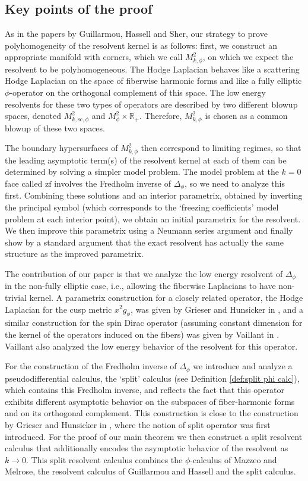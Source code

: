 \documentclass[11pt]{article}
\newcommand{\ie}{i.e.,\xspace}
\numberwithin{equation}{section}
\theoremstyle{plain}
\theoremstyle{definition}
\newcommand{\R}{{\mathbb{R}}}
\newcommand{\ssc}{{\mathrm{sc}}}
\newcommand{\zf}{{\mathrm{zf}}}
\begin{document}
\subsection{Key points of the proof}
As in the papers by Guillarmou, Hassell and Sher, our strategy to prove polyhomogeneity of the resolvent kernel is as follows: first, we construct an appropriate manifold with corners, which we call $M^2_{k,\phi}$, on which we expect the resolvent to be polyhomogeneous. The Hodge Laplacian behaves like a scattering Hodge Laplacian on the space of fiberwise harmonic forms and like a fully elliptic $\phi$-operator on the orthogonal complement of this space. The low energy resolvents for these two types of operators are described by two different blowup spaces, denoted $M^2_{k,\ssc,\phi}$ and $M^2_\phi\times\R_+$. Therefore, $M^2_{k,\phi}$ is chosen as a common blowup of these two spaces.

The boundary hypersurfaces of $M^2_{k,\phi}$ then correspond to limiting regimes, so that the leading asymptotic term(s) of the resolvent kernel at each of them can be determined by solving a simpler model problem. The model problem at the $k=0$ face called $\zf$ involves the Fredholm inverse of $\Delta_\phi$, so we need to analyze this first.
Combining these solutions and an interior parametrix, obtained by inverting the principal symbol (which corresponds to the `freezing coefficients' model problem at each interior point), we obtain an initial parametrix for the resolvent. We then improve this parametrix using a Neumann series argument and finally show by a standard argument that the exact resolvent has actually the same structure as the improved parametrix.

The contribution of our paper is that we analyze the low energy resolvent of $\Delta_{\phi}$ in the non-fully elliptic case, \ie allowing the fiberwise Laplacians to have non-trivial kernel. A parametrix construction for a closely related operator, the Hodge Laplacian for the cusp metric $x^2g_\phi$, was given by Grieser and Hunsicker in \cite{grieser-para}, and a similar construction for the spin Dirac operator (assuming constant dimension for the kernel of the operators induced on the fibers) was given by Vaillant in \cite{vaillant}. Vaillant also analyzed the low energy behavior of the resolvent for this operator.

For the construction of the Fredholm inverse of $\Delta_\phi$ we introduce and analyze a pseudodifferential calculus, the `split' calculus (see Definition \ref{def:split phi calc}), which contains this Fredholm inverse, and reflects the fact that this operator exhibits different asymptotic behavior on the subspaces of fiber-harmonic forms and on its orthogonal complement. This construction is close to the construction by Grieser and Hunsicker in \cite{grieser-para}, where the notion of split operator was first introduced.
For the proof of our main theorem we then construct a split resolvent calculus that additionally encodes the asymptotic behavior of the resolvent as $k\to0$. This split resolvent calculus combines the $\phi$-calculus of Mazzeo and Melrose, the resolvent calculus of Guillarmou and Hassell and the
split calculus.
\end{document}
